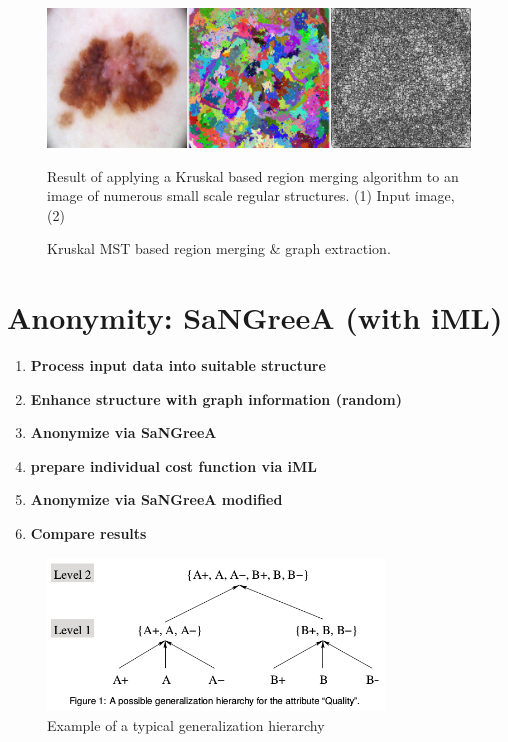 	\begin{figure}[H]
		\begin{center}
			\includegraphics [width=1\textwidth] {figures/graph_ext}
			\caption{Kruskal MST based region merging \& graph extraction.}
			\label{fig:graph_extract}
		\end{center}
		\small 
		Result of applying a Kruskal based region merging algorithm to an image of numerous small scale regular structures. (1) Input image, (2) 
		
	\end{figure}


\section{Anonymity: SaNGreeA (with iML)}
\label{sect:anonymization}

	\begin{enumerate}
		\item \textbf{Process input data into suitable structure}
		\item \textbf{Enhance structure with graph information (random)}
		\item \textbf{Anonymize via SaNGreeA}
		\item \textbf{prepare individual cost function via iML}
		\item \textbf{Anonymize via SaNGreeA modified}
		\item \textbf{Compare results}
	\end{enumerate}
	
	\begin{figure}[ht]
		\label{fig_anonIML}
		\begin{center}
			\includegraphics[width=0.8\textwidth]{figures/anonym/gen_hierarchy}
			\caption{Example of a typical generalization hierarchy}
		\end{center}
	\end{figure}	
	
